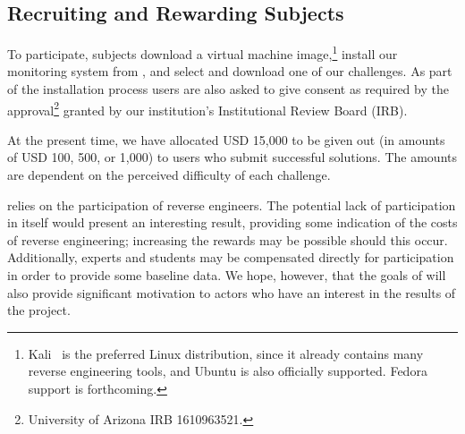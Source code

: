 \subsection{Recruiting and Rewarding Subjects}

To participate, subjects download a virtual machine image,\footnote{Kali~\cite{muniz2013web} is the preferred Linux distribution, since it already contains many reverse engineering tools, and Ubuntu is also officially supported.  Fedora support is forthcoming.} install our monitoring system from \revengeurl, and select and download one of our challenges. As part of the installation process users are also asked to give consent as required by the approval\footnote{University of Arizona IRB 1610963521.} granted by our institution's Institutional Review Board (IRB).


At the present time, we have allocated USD 15,000 to be given out (in amounts of USD 100, 500, or 1,000) to users who submit successful solutions. The amounts are dependent on the perceived difficulty of each challenge.

\revenge relies on the participation of reverse engineers.  The potential lack of participation in itself would present an interesting result, providing some indication of the costs of reverse engineering; increasing the rewards may be possible should this occur.  Additionally, experts and students may be compensated directly for participation in order to provide some baseline data.  We hope, however, that the goals of \revenge will also provide significant motivation to actors who have an interest in the results of the project.
